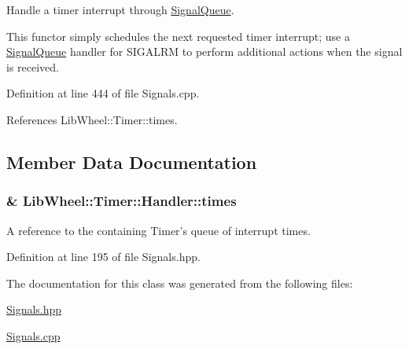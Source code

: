 \-Handle a timer interrupt through \hyperlink{classLibWheel_1_1SignalQueue}{\-Signal\-Queue}. 

\-This functor simply schedules the next requested timer interrupt; use a \hyperlink{classLibWheel_1_1SignalQueue}{\-Signal\-Queue} handler for \-S\-I\-G\-A\-L\-R\-M to perform additional actions when the signal is received. 

\-Definition at line 444 of file \-Signals.\-cpp.



\-References \-Lib\-Wheel\-::\-Timer\-::times.



\subsection{\-Member \-Data \-Documentation}
\hypertarget{classLibWheel_1_1Timer_1_1Handler_af2ecd2ad93ee6fa4989e8aac35e747d8}{
\subsubsection[{times}]{\& {\bf \-Lib\-Wheel\-::\-Timer\-::\-Handler\-::times}}}
\label{classLibWheel_1_1Timer_1_1Handler_af2ecd2ad93ee6fa4989e8aac35e747d8}


\-A reference to the containing \-Timer's queue of interrupt times. 



\-Definition at line 195 of file \-Signals.\-hpp.



\-The documentation for this class was generated from the following files\-:\begin{DoxyCompactItemize}
\item 
\hyperlink{Signals_8hpp}{\-Signals.\-hpp}\item 
\hyperlink{Signals_8cpp}{\-Signals.\-cpp}\end{DoxyCompactItemize}
